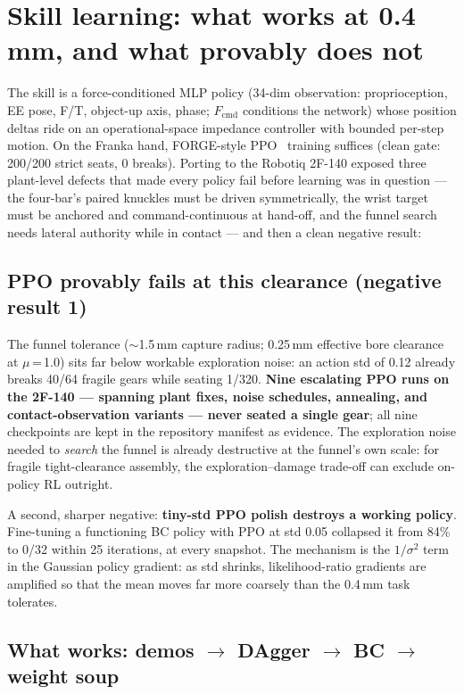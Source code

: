 \documentclass[11pt]{article}
\newcommand{\Fcmd}{\ensuremath{F_{\mathrm{cmd}}}}
\begin{document}
\section{Skill learning: what works at 0.4\,mm, and what provably does not}
\label{sec:skill}

The skill is a force-conditioned MLP policy (34-dim observation: proprioception, EE pose, F/T, object-up axis, phase; \Fcmd{} conditions the network) whose position deltas ride on an operational-space impedance controller with bounded per-step motion. On the Franka hand, FORGE-style PPO~\citep{schulman2017ppo} training suffices (clean gate: 200/200 strict seats, 0 breaks). Porting to the Robotiq 2F-140 exposed three plant-level defects that made every policy fail before learning was in question --- the four-bar's paired knuckles must be driven symmetrically, the wrist target must be anchored and command-continuous at hand-off, and the funnel search needs lateral authority while in contact --- and then a clean negative result:

\subsection{PPO provably fails at this clearance (negative result 1)}
\label{sec:ppo-fails}

The funnel tolerance ($\sim$1.5\,mm capture radius; 0.25\,mm effective bore clearance at $\mu$\,=\,1.0) sits far below workable exploration noise: an action std of 0.12 already breaks 40/64 fragile gears while seating 1/320. \textbf{Nine escalating PPO runs on the 2F-140 --- spanning plant fixes, noise schedules, annealing, and contact-observation variants --- never seated a single gear}; all nine checkpoints are kept in the repository manifest as evidence. The exploration noise needed to \emph{search} the funnel is already destructive at the funnel's own scale: for fragile tight-clearance assembly, the exploration--damage trade-off can exclude on-policy RL outright.

A second, sharper negative: \textbf{tiny-std PPO polish destroys a working policy}. Fine-tuning a functioning BC policy with PPO at std 0.05 collapsed it from 84\% to 0/32 within 25 iterations, at every snapshot. The mechanism is the $1/\sigma^2$ term in the Gaussian policy gradient: as std shrinks, likelihood-ratio gradients are amplified so that the mean moves far more coarsely than the 0.4\,mm task tolerates.

\subsection{What works: demos $\to$ DAgger $\to$ BC $\to$ weight soup}
\end{document}
